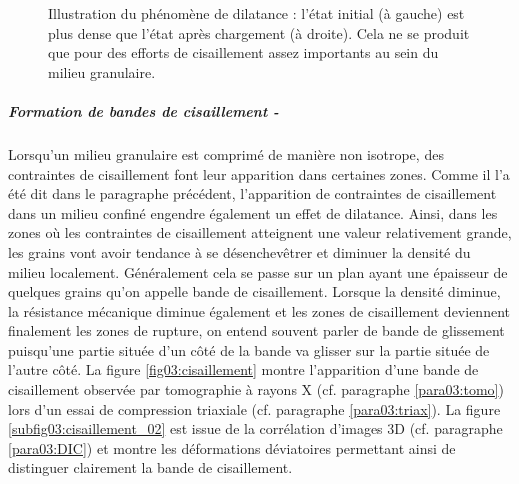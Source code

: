 \begin{figure}
\begin{minipage}[c]{0.4\textwidth}
					\end{minipage}
					\caption{\label{fig03:dilatance}Illustration du phénomène de dilatance : l'état initial (à gauche) est plus dense que l'état après chargement (à droite). Cela ne se produit que pour des efforts de cisaillement assez importants au sein du milieu granulaire.}
				\end{figure}
			\subparagraph{Formation de bandes de cisaillement -}\label{para03:bande_cisaillement}
				Lorsqu'un milieu granulaire est comprimé de manière non isotrope, des contraintes de cisaillement font leur apparition dans certaines zones. Comme il l'a été dit dans le paragraphe précédent, l'apparition de contraintes de cisaillement dans un milieu confiné engendre également un effet de dilatance. Ainsi, dans les zones où les contraintes de cisaillement atteignent une valeur relativement grande, les grains vont avoir tendance à se désenchevêtrer et diminuer la densité du milieu localement. Généralement cela se passe sur un plan ayant une épaisseur de quelques grains qu'on appelle bande de cisaillement. Lorsque la densité diminue, la résistance mécanique diminue également et les zones de cisaillement deviennent finalement les zones de rupture, on entend souvent parler de bande de glissement puisqu'une partie située d'un côté de la bande va glisser sur la partie située de l'autre côté. La figure \ref{fig03:cisaillement} montre l'apparition d'une bande de cisaillement observée par tomographie à rayons X (cf. paragraphe \ref{para03:tomo}) lors d'un essai de compression triaxiale (cf. paragraphe \ref{para03:triax}). La figure \ref{subfig03:cisaillement_02} est issue de la corrélation d'images 3D (cf. paragraphe \ref{para03:DIC}) et montre les déformations déviatoires permettant ainsi de distinguer clairement la bande de cisaillement.
